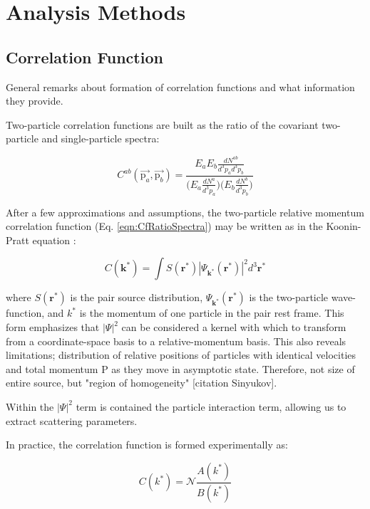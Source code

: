 \documentclass[ALICE,manyauthors]{cernphprep}
\newcommand{\kstar}{$k^{*}$\xspace}
\begin{document}
\section{Analysis Methods}
\label{sec:AnalysisMethods}

\subsection{Correlation Function}
\label{sec:CorrelationFunction}
General remarks about formation of correlation functions and what information they provide.

Two-particle correlation functions are built as the ratio of the covariant two-particle and single-particle spectra:

\begin{equation}
  C^{ab}(\vec{\mathrm{p}_{a}},\vec{\mathrm{p}_{b}}) = \frac{E_{a}E_{b}\frac{dN^{ab}}{d^{3}p_{a}d^{3}p_{b}}}{\big( E_{a}\frac{dN^{a}}{d^{3}p_{a}} \big) \big( E_{b}\frac{dN^{b}}{d^{3}p_{b}} \big)}
\label{eqn:CfRatioSpectra}
\end{equation}

After a few approximations and assumptions, the two-particle relative momentum correlation function (Eq. \ref{eqn:CfRatioSpectra}) may be written as in the Koonin-Pratt equation \cite{Koonin:1977fh, Pratt:1990zq}:

\begin{equation}
 C(\mathbf{k^{*}}) = \int S(\mathbf{r^{*}})|\Psi_{\mathbf{k^{*}}}(\mathbf{r^{*}})|^{2}d^{3}\mathbf{r^{*}}
\label{eqn:KooninPrattEqn}
\end{equation}

where $S(\mathbf{r^{*}})$ is the pair source distribution, $\Psi_{\mathbf{k^{*}}}(\mathbf{r^{*}})$ is the two-particle wave-function, and \kstar is the momentum of one particle in the pair rest frame.
This form emphasizes that $|\Psi|^{2}$ can be considered a kernel with which to transform from a coordinate-space basis to a relative-momentum basis.
This also reveals limitations; distribution of relative positions of particles with identical velocities and total momentum P as they move in asymptotic state.  Therefore, not size of entire source, but "region of homogeneity" [citation Sinyukov].

Within the $|\Psi|^{2}$ term is contained the particle interaction term, allowing us to extract scattering parameters.

In practice, the correlation function is formed experimentally as:

\begin{equation}
  C(k^{*}) = \mathcal{N}\frac{A(k^{*})}{B(k^{*})}
\label{eqn:CfExp}
\end{equation}
\end{document}
